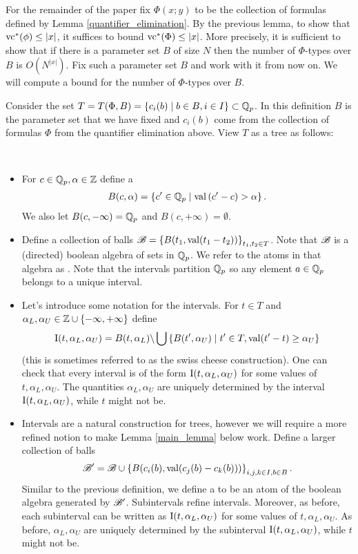 For the remainder of the paper fix $\Phi(x; y)$ to be the collection of formulas defined by Lemma \ref{quantifier_elimination}.
By the previous lemma, to show that $\operatorname{vc}^*(\phi) \leq |x|$, it suffices to bound $\operatorname{vc}^*(\Phi) \leq |x|$.
More precisely, it is sufficient to show that if there is a parameter set $B$ of size $N$
then the number of $\Phi$-types over $B$ is $O(N^{|x|})$.
Fix such a parameter set $B$ and work with it from now on.
We will compute a bound for the number of $\Phi$-types over $B$.

Consider the set $T = T(\Phi, B) = \left\{c_i(b) \mid b \in B, i \in I\right\} \subset \mathbb{Q}_p$.
In this definition $B$ is the parameter set that we have fixed 
and $c_i(b)$ come from the collection of formulas $\Phi$ from the quantifier elimination above.
View $T$ as a tree as follows:
\begin{Definition} \ 
  \begin{itemize}
  \item For $c \in \mathbb{Q}_p, \alpha \in \mathbb{Z}$  define a  
    \begin{align*}
      B(c, \alpha) = \left\{c' \in \mathbb{Q}_p \mid \operatorname{val} \left(c' - c\right) > \alpha\right\}.  
    \end{align*}
    We also let $B(c, -\infty) = \mathbb{Q}_p$ and $B(c, +\infty) = \emptyset$.
  \item Define a collection of balls $\mathscr B = \left\{B(t_1, \operatorname{val}(t_1 - t_2))\right\}_{t_1, t_2 \in T}$.
    Note that $\mathscr B$ is a (directed) boolean algebra of sets in $\mathbb{Q}_p$.
    We refer to the atoms in that algebra as \defn{intervals}.
    Note that the intervals partition $\mathbb{Q}_p$ so any element $a \in \mathbb{Q}_p$ belongs to a unique interval.
  \item Let's introduce some notation for the intervals.
    For $t \in T$ and $\alpha_L, \alpha_U \in \mathbb{Z} \cup \left\{-\infty, +\infty\right\}$ define
    \begin{align*}
      \operatorname{I}(t, \alpha_L, \alpha_U) = B(t, \alpha_L) \backslash \bigcup \left\{B(t', \alpha_U) \mid t' \in T, \operatorname{val}(t' - t) \geq \alpha_U\right\}
    \end{align*}
    (this is sometimes referred to as the swiss cheese construction).
    One can check that every interval is of the form $\operatorname{I}(t, \alpha_L, \alpha_U)$ for some values of $t, \alpha_L, \alpha_U$.
    The quantities $\alpha_L, \alpha_U$ are uniquely determined by the interval $\operatorname{I}(t, \alpha_L, \alpha_U)$,
    while $t$ might not be.
  \item Intervals are a natural construction for trees, however we will require a more refined notion to make Lemma \ref{main_lemma} below work.
    Define a larger collection of balls 
    \begin{align*}
      \mathscr B' = \mathscr B \cup \left\{B(c_i(b), \operatorname{val}(c_j(b) - c_k(b)))\right\}_{i,j,k \in I, b \in B}.  
    \end{align*}
    Similar to the previous definition, we define a  to be an atom of the boolean algebra generated by $\mathscr B'$.
    Subintervals refine intervals.
    Moreover, as before, each subinterval can be written as $\operatorname{I}(t, \alpha_L, \alpha_U)$ for some values of $t, \alpha_L, \alpha_U$.
    As before, $\alpha_L, \alpha_U$ are uniquely determined by the subinterval $\operatorname{I}(t, \alpha_L, \alpha_U)$,
    while $t$ might not be.
  \end{itemize}
\end{Definition}

